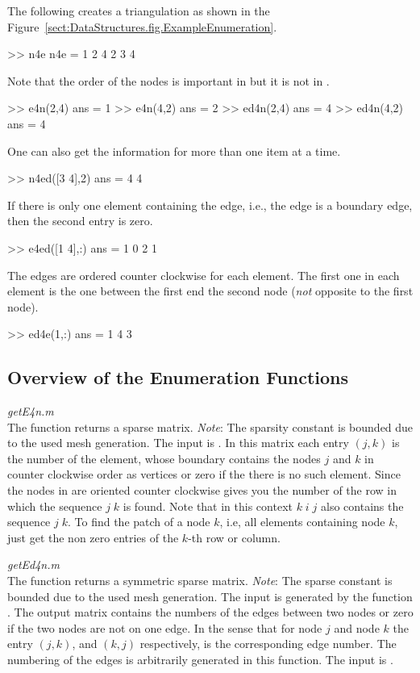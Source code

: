 \noindent The following  creates a triangulation as shown in the Figure~\ref{sect:DataStructures.fig.ExampleEnumeration}.
\begin{pcode}
>> n4e
n4e =
     1     2     4
     2     3     4
\end{pcode}
Note that the order of the nodes is important in  but it is not in .
\begin{pcode}
>> e4n(2,4)
ans =
     1
>> e4n(4,2)
ans =
     2
>> ed4n(2,4)
ans =
     4
>> ed4n(4,2)
ans =
     4
\end{pcode}
One can also get the information for more than one item at a time.
\begin{pcode}
>> n4ed([3 4],2)
ans =
     4
     4
\end{pcode}
If there is only one element containing the edge, i.e., the edge is a boundary edge, then the second entry is zero.
\begin{pcode}
>> e4ed([1 4],:)
ans =
     1     0
     2     1
\end{pcode}
The edges are ordered counter clockwise for each element. The first one in each element is the one
between the first end the second node (\emph{not} opposite to the first node).
\begin{pcode}
>> ed4e(1,:)
ans =
     1     4     3
\end{pcode}
\bigskip

\subsection{Overview of the Enumeration Functions}$ $\\

\noindent\emph{getE4n.m}\smallskip\\
The function  returns a  sparse matrix. \emph{Note}: The sparsity constant is bounded due to the used mesh generation. The input is . In this matrix each entry $(j,k)$ is the number of the element, whose boundary contains the nodes $j$ and $k$ in counter clockwise order as vertices or zero if the there is no such element. Since the nodes in  are oriented counter clockwise  gives you the number of the row in which the sequence $j\;k$ is found. Note that in this context $k\;i\;j$ also contains the sequence $j\;k$. To find the patch of a node $k$, i.e, all elements containing node $k$, just get the non zero entries of the $k$-th row or column.\bigskip


\noindent\emph{getEd4n.m}\smallskip\\
The function  returns a symmetric  sparse matrix. \emph{Note}: The sparse constant is bounded due to the used mesh generation. The input is  generated by the function . The output matrix  contains the numbers of the edges between two nodes or zero if the two nodes are not on one edge. In the sense that for node $j$ and node $k$ the entry $(j,k)$, and $(k,j)$ respectively, is the corresponding edge number. The numbering of the edges is arbitrarily generated in this function. The input is .\bigskip


